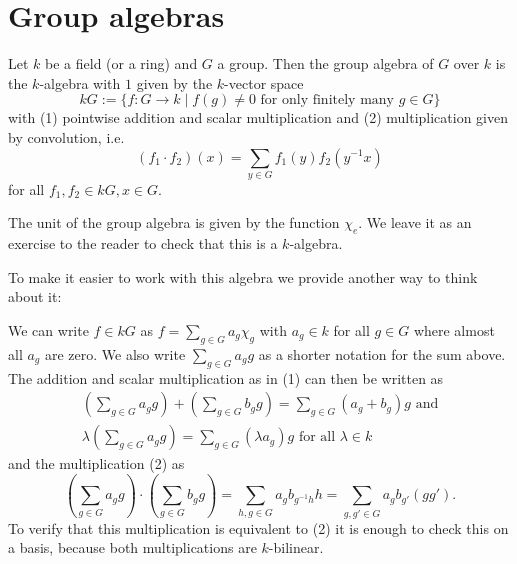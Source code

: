 \section{Group algebras}


\begin{defi}
 Let $k$ be a field (or a ring) and $G$ a group. Then the group algebra of $G$ over $k$ is the $k$-algebra with $1$ given by the $k$-vector space
 \[
  kG := \{f : G \to k \mid f(g) \neq 0 \text{ for only finitely many } g \in G\}
 \]
 with (1) pointwise addition and scalar multiplication and (2) multiplication given by convolution, i.e.
 \[
  (f_1 \cdot f_2)(x) = \sum_{y \in G} f_1(y) f_2\left(y^{-1}x\right)
 \]
 for all $f_1, f_2 \in kG, x \in G$.
\end{defi}

The unit of the group algebra is given by the function $\chi_e$. We leave it as an exercise to the reader to check that this is a $k$-algebra.

To make it easier to work with this algebra we provide another way to think about it:

We can write $f \in kG$ as $f = \sum_{g \in G} a_g \chi_g$ with $a_g \in k$ for all $g \in G$ where almost all $a_g$ are zero. We also write $\sum_{g \in G} a_g g$ as a shorter notation for the sum above. The addition and scalar multiplication as in (1) can then be written as
\begin{gather*}
 \left( \sum_{g \in G} a_g g \right) + \left( \sum_{g \in G} b_g g \right) = \sum_{g \in G} (a_g+b_g) g \text{ and}\\
 \lambda \left( \sum_{g \in G} a_g g \right) = \sum_{g \in G} (\lambda a_g) g \text{ for all } \lambda \in k
\end{gather*}
and the multiplication (2) as
\[
 \left( \sum_{g \in G} a_g g \right) \cdot \left( \sum_{g \in G} b_g g \right)
 = \sum_{h, g \in G} a_g b_{g^{-1}h} h
 = \sum_{g, g' \in G} a_g b_{g'} (g g').
\]
To verify that this multiplication is equivalent to (2) it is enough to check this on a basis, because both multiplications are $k$-bilinear.

